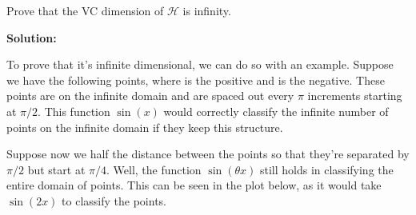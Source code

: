 \documentclass[12pt]{article}
\begin{document}
\begin{enumerate}
Prove that the VC dimension of $\mathcal{H}$ is infinity.

{\bf Solution:}

To prove that it's infinite dimensional, we can do so with an example. Suppose we have the following points, where {\color{red}{red}} is the positive and {\color{blue}{blue}} is the negative. These points are on the infinite domain and are spaced out every $\pi$ increments starting at $\pi/2$. This function $\sin(x)$ would correctly classify the infinite number of points on the infinite domain if they keep this structure. 


Suppose now we half the distance between the points so that they're separated by $\pi/2$ but start at $\pi/4$. Well, the function $\sin(\theta x)$ still holds in classifying the entire domain of points. This can be seen in the plot below, as it would take $\sin (2x)$ to classify the points.


\end{enumerate}
\end{document}
